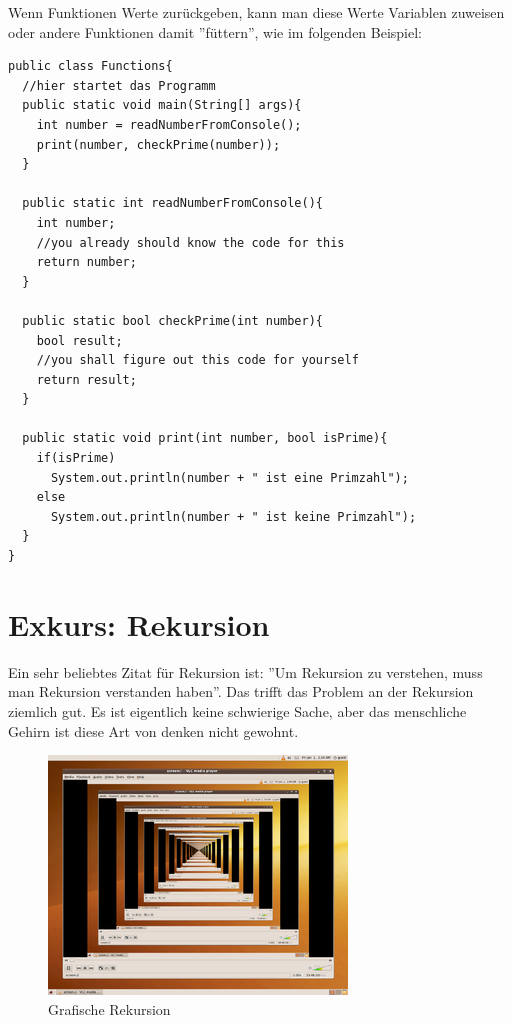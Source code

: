 Wenn Funktionen Werte zurückgeben, kann man diese Werte Variablen zuweisen oder andere Funktionen damit ''füttern'', wie im folgenden Beispiel:

\begin{minipage}{\textwidth}
\begin{lstlisting}
public class Functions{
  //hier startet das Programm
  public static void main(String[] args){
    int number = readNumberFromConsole();
    print(number, checkPrime(number));
  }      
  
  public static int readNumberFromConsole(){
    int number;
    //you already should know the code for this
    return number;
  }
  
  public static bool checkPrime(int number){
    bool result;
    //you shall figure out this code for yourself
    return result;
  }
  
  public static void print(int number, bool isPrime){
    if(isPrime)
      System.out.println(number + " ist eine Primzahl");
    else
      System.out.println(number + " ist keine Primzahl");
  }
}
\end{lstlisting}
\end{minipage}

\section{Exkurs: Rekursion}

Ein sehr beliebtes Zitat für Rekursion ist: ''Um Rekursion zu verstehen, muss man Rekursion verstanden haben''. Das trifft das Problem an der Rekursion ziemlich gut. Es ist eigentlich keine schwierige Sache, aber das menschliche Gehirn ist diese Art von denken nicht gewohnt. 

\begin{figure}
	\begin{center}\includegraphics{images/rekursion.png}\end{center}
	\caption{Grafische Rekursion}
\end{figure}

